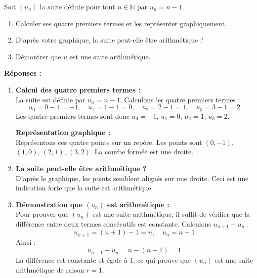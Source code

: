 \documentclass[a4paper,12pt]{article}
\begin{document}
      \bigskip
      
      \begin{tcolorbox}[colback=gray!10, colframe=gray!50, title=Exercice \textbf{103}]
      Soit $(u_n)$ la suite définie pour tout $n \in \mathbb{N}$ par $u_n = n - 1$.
      \begin{enumerate}
          \item Calculer ses quatre premiers termes et les représenter graphiquement.
          \item D'après votre graphique, la suite peut-elle être arithmétique ?
          \item Démontrer que $u$ est une suite arithmétique.
      \end{enumerate}
      \end{tcolorbox}
      
      \bigskip
      
      \textbf{Réponses :}
      
      \begin{enumerate}
          \item \textbf{Calcul des quatre premiers termes :} \\
          La suite est définie par $u_n = n - 1$. Calculons les quatre premiers termes :
          \[
          u_0 = 0 - 1 = -1, \quad u_1 = 1 - 1 = 0, \quad u_2 = 2 - 1 = 1, \quad u_3 = 3 - 1 = 2
          \]
          Les quatre premiers termes sont donc $u_0 = -1$, $u_1 = 0$, $u_2 = 1$, $u_3 = 2$.
          
          \textbf{Représentation graphique :} \\
          Représentons ces quatre points sur un repère. Les points sont $(0, -1)$, $(1, 0)$, $(2, 1)$, $(3, 2)$. La courbe formée est une droite.
      
          \item \textbf{La suite peut-elle être arithmétique ?} \\
          D'après le graphique, les points semblent alignés sur une droite. Ceci est une indication forte que la suite est arithmétique.
      
          \item \textbf{Démonstration que $(u_n)$ est arithmétique :} \\
          Pour prouver que $(u_n)$ est une suite arithmétique, il suffit de vérifier que la différence entre deux termes consécutifs est constante. Calculons $u_{n+1} - u_n$ :
          \[
          u_{n+1} = (n+1) - 1 = n, \quad u_n = n - 1
          \]
          Ainsi :
          \[
          u_{n+1} - u_n = n - (n - 1) = 1
          \]
          La différence est constante et égale à 1, ce qui prouve que $(u_n)$ est une suite arithmétique de raison $r = 1$.
      \end{enumerate}
      
\end{document}
